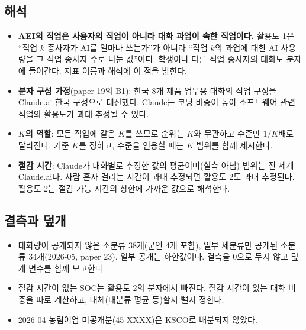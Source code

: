 \documentclass[11pt]{article}
\begin{document}
\subsection{해석}
\begin{itemize}[leftmargin=*]
  \item \textbf{AEI의 직업은 사용자의 직업이 아니라 대화 과업이 속한 직업이다.} 활용도 1은 ``직업 $k$ 종사자가 AI를 얼마나 쓰는가''가 아니라 ``직업 $k$의 과업에 대한 AI 사용량을 그 직업 종사자 수로 나눈 값''이다. 학생이나 다른 직업 종사자의 대화도 분자에 들어간다. 지표 이름과 해석에 이 점을 밝힌다.
  \item \textbf{분자 구성 가정}(paper 19의 B1): 한국 8개 제품 업무용 대화의 직업 구성을 Claude.ai 한국 구성으로 대신했다. Claude는 코딩 비중이 높아 소프트웨어 관련 직업의 활용도가 과대 추정될 수 있다.
  \item \textbf{$K$의 역할}: 모든 직업에 같은 $K$를 쓰므로 순위는 $K$와 무관하고 수준만 $1/K$배로 달라진다. 기준 $K$를 정하고, 수준을 인용할 때는 $K$ 범위를 함께 제시한다.
  \item \textbf{절감 시간}: Claude가 대화별로 추정한 값의 평균이며(실측 아님) 범위는 전 세계 Claude.ai다. 사람 혼자 걸리는 시간이 과대 추정되면 활용도 2도 과대 추정된다. 활용도 2는 절감 가능 시간의 상한에 가까운 값으로 해석한다.
\end{itemize}

\subsection{결측과 덮개}
\begin{itemize}[leftmargin=*]
  \item 대화량이 공개되지 않은 소분류 38개(군인 4개 포함), 일부 세분류만 공개된 소분류 34개(2026-05, paper 23). 일부 공개는 하한값이다. 결측을 0으로 두지 않고 덮개 변수를 함께 보고한다.
  \item 절감 시간이 없는 SOC는 활용도 2의 분자에서 빠진다. 절감 시간이 있는 대화 비중을 따로 계산하고, 대체(대분류 평균 등)할지 뺄지 정한다.
  \item 2026-04 농림어업 미공개분(45-XXXX)은 KSCO로 배분되지 않았다.
\end{itemize}
\end{document}
